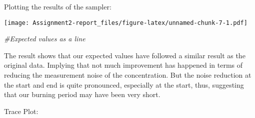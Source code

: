 \documentclass[
]{article}
\newenvironment{Shaded}{\begin{snugshade}}{\end{snugshade}}
\newcommand{\AttributeTok}[1]{\textcolor[rgb]{0.77,0.63,0.00}{#1}}
\newcommand{\CommentTok}[1]{\textcolor[rgb]{0.56,0.35,0.01}{\textit{#1}}}
\newcommand{\DecValTok}[1]{\textcolor[rgb]{0.00,0.00,0.81}{#1}}
\newcommand{\FloatTok}[1]{\textcolor[rgb]{0.00,0.00,0.81}{#1}}
\newcommand{\FunctionTok}[1]{\textcolor[rgb]{0.00,0.00,0.00}{#1}}
\newcommand{\NormalTok}[1]{#1}
\newcommand{\OtherTok}[1]{\textcolor[rgb]{0.56,0.35,0.01}{#1}}
\newcommand{\SpecialCharTok}[1]{\textcolor[rgb]{0.00,0.00,0.00}{#1}}
\newcommand{\StringTok}[1]{\textcolor[rgb]{0.31,0.60,0.02}{#1}}
\begin{document}
Plotting the results of the sampler:

\begin{Shaded}
\end{Shaded}

\texttt{[image: Assignment2-report\_files/figure-latex/unnamed-chunk-7-1.pdf]}

\begin{Shaded}
\begin{Highlighting}[]
\CommentTok{\#Expected values as a line}
\end{Highlighting}
\end{Shaded}

The result shows that our expected values have followed a similar result
as the original data. Implying that not much improvement has happened in
terms of reducing the measurement noise of the concentration. But the
noise reduction at the start and end is quite pronounced, especially at
the start, thus, suggesting that our burning period may have been very
short.

Trace Plot:
\end{document}
